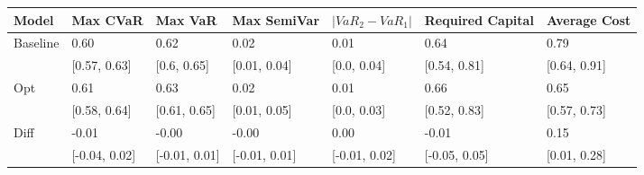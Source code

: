 \begin{tabular}{lllllll}
\toprule
   Model &      Max CVaR &       Max VaR &   Max SemiVar & $|VaR_2 - VaR_1|$ & Required Capital & Average Cost \\
\midrule
Baseline &          0.60 &          0.62 &          0.02 &              0.01 &             0.64 &         0.79 \\
         &  [0.57, 0.63] &   [0.6, 0.65] &  [0.01, 0.04] &       [0.0, 0.04] &     [0.54, 0.81] & [0.64, 0.91] \\
     Opt &          0.61 &          0.63 &          0.02 &              0.01 &             0.66 &         0.65 \\
         &  [0.58, 0.64] &  [0.61, 0.65] &  [0.01, 0.05] &       [0.0, 0.03] &     [0.52, 0.83] & [0.57, 0.73] \\
    Diff &         -0.01 &         -0.00 &         -0.00 &              0.00 &            -0.01 &         0.15 \\
         & [-0.04, 0.02] & [-0.01, 0.01] & [-0.01, 0.01] &     [-0.01, 0.02] &    [-0.05, 0.05] & [0.01, 0.28] \\
\bottomrule
\end{tabular}
